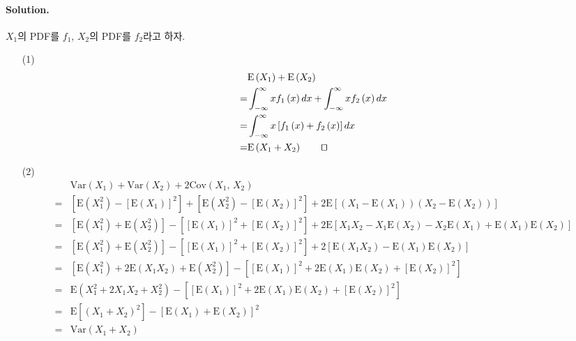 \paragraph{Solution.} $X_1$의 PDF를 $f_1$, $X_2$의 PDF를 $f_2$라고 하자.

\begin{itemize}
	\item [(1)] {
		\begin{align*}
			& \mathrm{E}\left(X_1\right) + \mathrm{E}\left(X_2\right) \\
			=& \int_{-\infty}^\infty xf_1\left(x\right) dx + \int_{-\infty}^\infty xf_2\left(x\right) dx \\
			=& \int_{-\infty}^\infty x\left[f_1\left(x\right) + f_2\left(x\right)\right] dx \\
			=& \mathrm{E}\left(X_1 + X_2\right) \qquad \qed
		\end{align*}
	}
	\item [(2)] {
		\begin{align*}
			& \mathrm{Var}\left(X_1\right) + \mathrm{Var}\left(X_2\right) + 2\mathrm{Cov}\left(X_1,\,X_2\right) \\
			=& \left[\mathrm{E}\left(X_1^2\right) - \left[\mathrm{E}\left(X_1\right)\right]^2\right] + \left[\mathrm{E}\left(X_2^2\right) - \left[\mathrm{E}\left(X_2\right)\right]^2\right] + 2\mathrm{E}\left[\left(X_1-\mathrm{E}\left(X_1\right)\right)\left(X_2-\mathrm{E}\left(X_2\right)\right)\right] \\
			=& \left[\mathrm{E}\left(X_1^2\right) + \mathrm{E}\left(X_2^2\right)\right] - \left[\left[\mathrm{E}\left(X_1\right)\right]^2 + \left[\mathrm{E}\left(X_2\right)\right]^2\right] + 2\mathrm{E}\left[X_1X_2  - X_1\mathrm{E}\left(X_2\right) - X_2\mathrm{E}\left(X_1\right) + \mathrm{E}\left(X_1\right)\mathrm{E}\left(X_2\right)\right] \\
			=& \left[\mathrm{E}\left(X_1^2\right) + \mathrm{E}\left(X_2^2\right)\right] - \left[\left[\mathrm{E}\left(X_1\right)\right]^2 + \left[\mathrm{E}\left(X_2\right)\right]^2\right] + 2\left[\mathrm{E}\left(X_1X_2\right) - \mathrm{E}\left(X_1\right)\mathrm{E}\left(X_2\right)\right] \\
			=& \left[\mathrm{E}\left(X_1^2\right) + 2\mathrm{E}\left(X_1X_2\right) + \mathrm{E}\left(X_2^2\right)\right] - \left[\left[\mathrm{E}\left(X_1\right)\right]^2 + 2\mathrm{E}\left(X_1\right)\mathrm{E}\left(X_2\right) + \left[\mathrm{E}\left(X_2\right)\right]^2\right] \\
			=& \mathrm{E}\left(X_1^2 + 2X_1X_2 + X_2^2\right) - \left[\left[\mathrm{E}\left(X_1\right)\right]^2 + 2\mathrm{E}\left(X_1\right)\mathrm{E}\left(X_2\right) + \left[\mathrm{E}\left(X_2\right)\right]^2\right] \\
			=& \mathrm{E}\left[\left(X_1+X_2\right)^2\right] - \left[\mathrm{E}\left(X_1\right) + \mathrm{E}\left(X_2\right)\right]^2 \\
			=& \mathrm{Var}\left(X_1 + X_2\right)
		\end{align*}
	}
\end{itemize}

